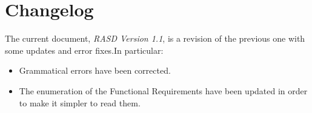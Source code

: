\documentclass[11pt,a4paper]{report}
\begin{document}
\section{Changelog}
The current document, \textit{RASD Version 1.1}, is a revision of the previous one with some updates and error fixes.In particular:
\begin{itemize}
\item Grammatical errors have been corrected.
\item The enumeration of the Functional Requirements have been updated in order to make it simpler to read them.
\end{itemize}
%
\end{document}
